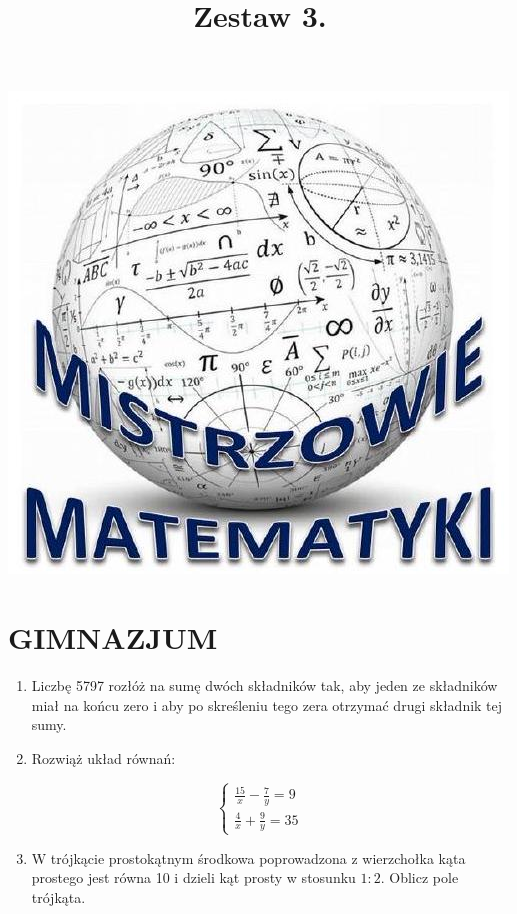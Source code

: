 \documentclass[10pt]{article}
\title{Zestaw 3. }
\author{}
\date{}
\begin{document}
\maketitle
\begin{center}
\includegraphics[max width=\textwidth]{2024_11_21_707bbc5bde3efcc74a79g-1(1)}
\end{center}

\section*{GIMNAZJUM}
\begin{enumerate}
  \item Liczbę 5797 rozłóż na sumę dwóch składników tak, aby jeden ze składników miał na końcu zero i aby po skreśleniu tego zera otrzymać drugi składnik tej sumy.
  \item Rozwiąż układ równań:
\end{enumerate}

\[
\left\{\begin{array}{l}
\frac{15}{x}-\frac{7}{y}=9 \\
\frac{4}{x}+\frac{9}{y}=35
\end{array}\right.
\]

\begin{enumerate}
  \setcounter{enumi}{2}
  \item W trójkącie prostokątnym środkowa poprowadzona z wierzchołka kąta prostego jest równa 10 i dzieli kąt prosty w stosunku \(1: 2\). Oblicz pole trójkąta.
\end{enumerate}
\end{document}

